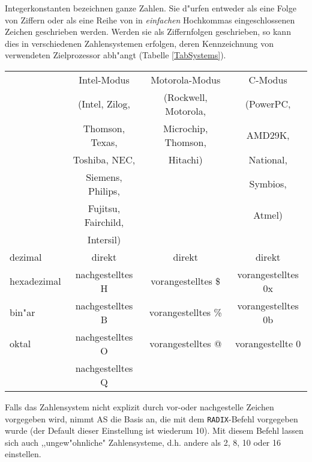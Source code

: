 \documentclass[12pt,a4paper,twoside]{report}
\begin{document}
Integerkonstanten bezeichnen ganze Zahlen.  Sie d"urfen entweder als eine
Folge von Ziffern oder als eine Reihe von in {\em einfachen} Hochkommas
eingeschlossenen Zeichen geschrieben werden.  Werden sie als Ziffernfolgen
geschrieben, so kann dies in verschiedenen Zahlensystemen erfolgen, deren
Kennzeichnung von verwendeten Zielprozessor abh"angt (Tabelle
\ref{TabSystems}).
\par
\begin{table*}[htbp]
\begin{center}\begin{tabular}{|l|c|c|c|}
\hline
            & Intel-Modus      & Motorola-Modus       &   C-Modus  \\
            & (Intel, Zilog,   & (Rockwell, Motorola, &  (PowerPC, \\
            & Thomson, Texas,  &  Microchip, Thomson, &   AMD29K,  \\
            & Toshiba, NEC,    &  Hitachi)            &   National,\\
            & Siemens, Philips, &                     &   Symbios, \\
            & Fujitsu, Fairchild, &                   &   Atmel)   \\
            & Intersil)        &                      &            \\
\hline
\hline
dezimal     & direkt           & direkt               & direkt \\
hexadezimal & nachgestelltes H & vorangestelltes \$   & vorangestelltes 0x \\
bin"ar      & nachgestelltes B & vorangestelltes \%   & vorangestelltes 0b \\
oktal       & nachgestelltes O & vorangestelltes @    & vorangestellte 0 \\
            & nachgestelltes Q &                      &                  \\
\hline
\end{tabular}\end{center}
\caption{m"ogliche Zahlensysteme\label{TabSystems}}
\end{table*}
Falls das Zahlensystem nicht explizit durch vor-oder nachgestelle Zeichen
vorgegeben wird, nimmt AS die Basis an, die mit dem {\tt RADIX}-Befehl
vorgegeben wurde (der Default dieser Einstellung ist wiederum 10).  Mit
diesem Befehl lassen sich auch ,,ungew"ohnliche" Zahlensysteme, d.h.
andere als 2, 8, 10 oder 16 einstellen.
\end{document}

